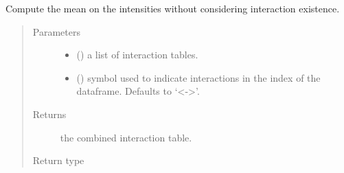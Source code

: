 \documentclass[letterpaper,10pt,english]{sphinxmanual}
\begin{document}
\begin{fulllineitems}
\label{\detokenize{_modules/cosifer.combiners:cosifer.combiners.cit.hard_mean_table}}
Compute the mean on the intensities without considering interaction
existence.
\begin{quote}\begin{description}
\item[{Parameters}] \leavevmode\begin{itemize}
\item {} 
 () \textendash{} a list of interaction tables.

\item {} 
 (\sphinxstyleliteralemphasis{\sphinxupquote{, }}) \textendash{} symbol used to indicate
interactions in the index of the dataframe. Defaults to ‘\textless{}-\textgreater{}’.

\end{itemize}

\item[{Returns}] \leavevmode
the combined interaction table.

\item[{Return type}] \leavevmode
{\hyperref[\detokenize{_modules/cosifer.collections:cosifer.collections.interaction_table.InteractionTable}]{}}

\end{description}\end{quote}

\end{fulllineitems}

\end{document}
